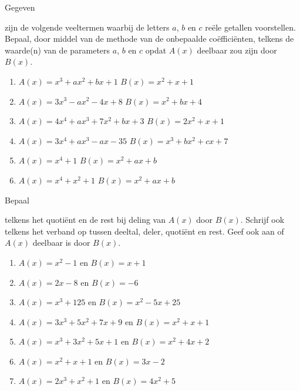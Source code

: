 \documentclass{ximera}
\begin{document}
\begin{Oefening}\setcounter{enumi}{9} 
\hypertarget{oef2.9}{Gegeven} zijn de volgende veeltermen waarbij de letters $a$, $b$ en $c$ re\"ele getallen voorstellen. Bepaal, door middel van de methode van de onbepaalde co\"effici\"enten, telkens de waarde(n) van de parameters $a$, $b$ en $c$ opdat $A(x)$ deelbaar zou zijn door $B(x)$. 
\begin{enumerate}
\item
$A(x) = x^3 + ax^2 + bx + 1$ \quad {} \quad $B(x) = x^2 + x + 1$
\item
$A(x) = 3x^3 - ax^2 - 4x + 8$ \quad {} \quad $B(x) = x^2 + bx + 4$
\item
$A(x) = 4x^4 + ax^3 + 7x^2 + bx + 3$ \quad {} \quad $B(x) = 2x^2 + x + 1$
\item
$A(x) = 3x^4 + ax^3 -ax - 35$ \quad {} \quad $B(x) = x^3 + bx^2 + cx + 7$
\item %
$A(x) = x^4+1$ \quad {} \quad $B(x) = x^2+ax+b$
\item %
$A(x) = x^4+x^2+1$ \quad {} \quad $B(x) = x^2+ax+b$
\end{enumerate}
\end{Oefening}

\begin{Oefening}\setcounter{enumi}{10} 
\hypertarget{oef2.10}{Bepaal} telkens het quoti\"ent en de rest bij deling van $A(x)$ door $B(x)$. Schrijf ook telkens het verband op tussen deeltal, deler, quoti\"ent en rest. Geef ook aan of $A(x)$ deelbaar is door $B(x)$.
\begin{enumerate}
\item
$A(x) = x^2-1$ \quad en \quad $B(x) = x+1$
\item
$A(x) = 2x-8$ \quad en \quad $B(x) = -6$
\item
$A(x) = x^3 +125$ \quad en \quad $B(x) = x^2 - 5x + 25$ 
\item
$A(x) = 3x^3 + 5x^2 + 7x + 9$ \quad en \quad $B(x) = x^2 + x + 1$ 
\item
$A(x) = x^3 + 3x^2 + 5x + 1$ \quad en \quad $B(x) = x^2 + 4x + 2$ 
\item
$A(x) = x^2+x+1$ en $B(x) = 3x-2$ 
\item
$A(x) = 2x^3 + x^2 + 1$ en $B(x) = 4x^2 + 5$ 
\end{enumerate}
\end{Oefening}
\end{document}
